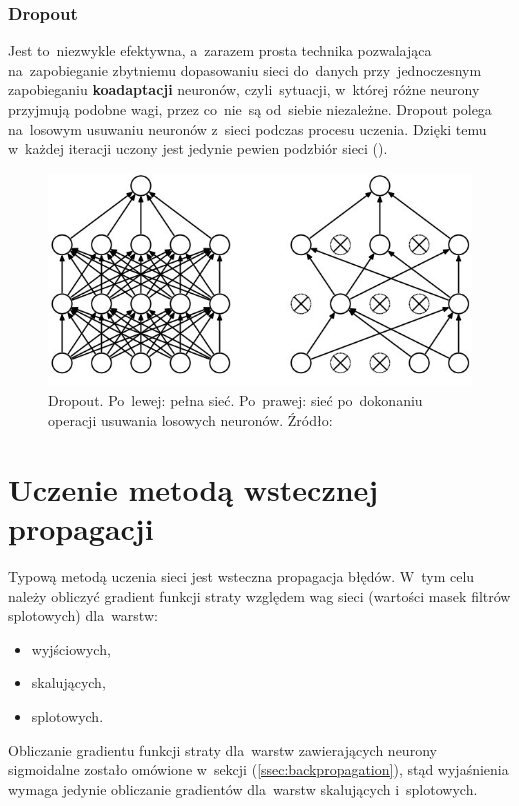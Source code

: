 \subsubsection{Dropout}
Jest to~niezwykle efektywna, a~zarazem prosta technika pozwalająca na~zapobieganie zbytniemu dopasowaniu sieci
do~danych przy~jednoczesnym zapobieganiu \textbf{koadaptacji} neuronów, czyli~sytuacji, w~której różne neurony
przyjmują podobne wagi, przez co~nie~są od~siebie niezależne. Dropout polega na~losowym usuwaniu neuronów z~sieci
podczas procesu uczenia. Dzięki temu w~każdej iteracji uczony jest jedynie pewien podzbiór sieci (\cite{dropout}).

\begin{figure}[H]
	\centering
	\includegraphics[width=\linewidth]{img/dropout.jpeg}
	\caption{Dropout. Po~lewej: pełna sieć. Po~prawej: sieć po~dokonaniu operacji usuwania losowych neuronów.
	         Źródło: \cite{dropout}}
\end{figure}

\section{Uczenie metodą wstecznej propagacji}
Typową metodą uczenia sieci jest wsteczna propagacja błędów. W~tym celu należy obliczyć gradient funkcji
straty względem wag sieci (wartości masek filtrów splotowych) dla~warstw:
\begin{itemize}
  \item wyjściowych,
  \item skalujących,
  \item splotowych.
\end{itemize}
Obliczanie gradientu funkcji straty dla~warstw zawierających neurony sigmoidalne zostało omówione
w~sekcji (\ref{ssec:backpropagation}), stąd wyjaśnienia wymaga jedynie obliczanie gradientów dla~warstw skalujących i~splotowych.

